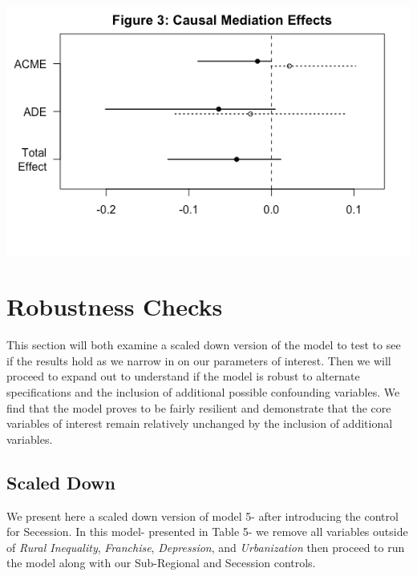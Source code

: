 \documentclass[letter, 12pt]{article}
\begin{document}
\includegraphics[scale=0.80]{ps745-figure2b}

\section{Robustness Checks}

This section will both examine a scaled down version of the model to test to see if the results hold as we narrow in on our parameters of interest. Then we will proceed to expand out to understand if the model is robust to alternate specifications and the inclusion of additional possible confounding variables. We find that the model proves to be fairly resilient and demonstrate that the core variables of interest remain relatively unchanged by the inclusion of additional variables.

\subsection{Scaled Down}

We present here a scaled down version of model 5- after introducing the control for Secession. In this model- presented in Table 5- we remove all variables outside of \emph{Rural Inequality}, \emph{Franchise}, \emph{Depression}, and \emph{Urbanization} then proceed to run the model along with our Sub-Regional and Secession controls. 
\end{document}
